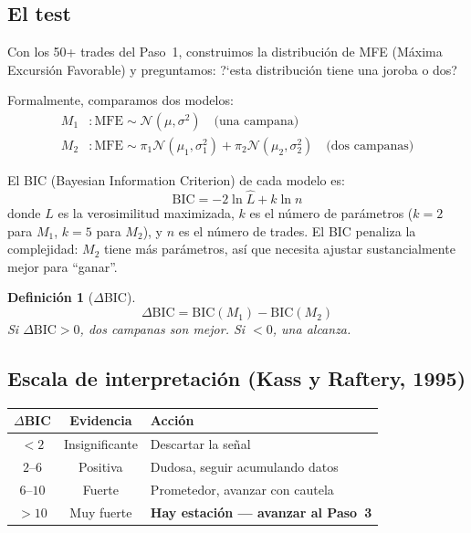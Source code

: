 \documentclass[11pt,a4paper]{article}
\newtheorem{definition}{Definici\'on}[section]
\begin{document}
\subsection{El test}

Con los 50+ trades del Paso~1, construimos la distribuci\'on de MFE
(M\'axima Excursi\'on Favorable) y preguntamos: ?`esta distribuci\'on
tiene una joroba o dos?

Formalmente, comparamos dos modelos:
\begin{align}
M_1&: \text{MFE} \sim \mathcal{N}(\mu, \sigma^2) \quad \text{(una campana)} \\
M_2&: \text{MFE} \sim \pi_1 \mathcal{N}(\mu_1, \sigma_1^2) + \pi_2 \mathcal{N}(\mu_2, \sigma_2^2) \quad \text{(dos campanas)}
\end{align}

El BIC (Bayesian Information Criterion) de cada modelo es:
\begin{equation}
\text{BIC} = -2 \ln \hat{L} + k \ln n
\end{equation}
donde $\hat{L}$ es la verosimilitud maximizada, $k$ es el n\'umero de
par\'ametros ($k=2$ para $M_1$, $k=5$ para $M_2$), y $n$ es el n\'umero
de trades. El BIC penaliza la complejidad: $M_2$ tiene m\'as par\'ametros,
as\'i que necesita ajustar sustancialmente mejor para ``ganar''.

\begin{definition}[$\Delta$BIC]
\begin{equation}
\Delta\text{BIC} = \text{BIC}(M_1) - \text{BIC}(M_2)
\end{equation}
Si $\Delta\text{BIC} > 0$, dos campanas son mejor. Si $< 0$, una alcanza.
\end{definition}

\subsection{Escala de interpretaci\'on (Kass y Raftery, 1995)}

\begin{table}[H]
\centering
\begin{tabular}{ccl}
\toprule
$\Delta$\textbf{BIC} & \textbf{Evidencia} & \textbf{Acci\'on} \\
\midrule
$< 2$ & Insignificante & Descartar la se\~nal \\
$2$--$6$ & Positiva & Dudosa, seguir acumulando datos \\
$6$--$10$ & Fuerte & Prometedor, avanzar con cautela \\
$> 10$ & Muy fuerte & \textbf{Hay estaci\'on --- avanzar al Paso~3} \\
\bottomrule
\end{tabular}
\end{table}
\end{document}
